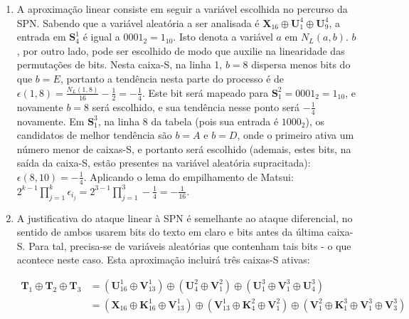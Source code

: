 \documentclass{article}
\begin{document}
\begin{enumerate}
    \item A aproximação linear consiste em seguir a variável escolhida no
        percurso da SPN. Sabendo que a variável aleatória a ser analisada é
        $\textbf{X}_{16} \oplus \textbf{U}^{4}_{1} \oplus \textbf{U}^{4}_{9}$,
        a entrada em $\textbf{S}^{1}_{4}$ é igual a $0001_{2} = 1_{10}$. Isto
        denota a variável $a$ em $N_{L}(a, b)$. $b$, por outro lado, pode ser
        escolhido de modo que auxilie na linearidade das permutações de bits.
        Nesta caixa-S, na linha 1, $b = 8$ dispersa menos bits do que $b = E$,
        portanto a tendência nesta parte do processo é de
        $\epsilon(1, 8) = \frac{N_{L}(1, 8)}{16} - \frac{1}{2} = -\frac{1}{4}$.
        Este bit será mapeado para $\textbf{S}^{2}_{1} = 0001_{2} = 1_{10}$,
        e novamente $b = 8$ será escolhido, e sua tendência nesse ponto será
        $-\frac{1}{4}$ novamente. Em $\textbf{S}^{3}_{1}$, na linha 8 da
        tabela (pois sua entrada é $1000_{2}$), os candidatos de melhor
        tendência são $b = A$ e $b = D$, onde o primeiro ativa um número menor
        de caixas-S, e portanto será escolhido (ademais, estes bits, na saída
        da caixa-S, estão presentes na variável aleatória supracitada):
        $\epsilon(8, 10) = -\frac{1}{4}$. Aplicando o lema do empilhamento de
        Matsui: $2^{k-1} \prod_{j=1}^{k} \epsilon_{i_{j}}
        = 2^{3-1} \prod_{j=1}^{3} -\frac{1}{4} = -\frac{1}{16}$.

    \item A justificativa do ataque linear à SPN é semelhante ao ataque
        diferencial, no sentido de ambos usarem bits do texto em claro e bits
        antes da última caixa-S. Para tal, precisa-se de variáveis aleatórias
        que contenham tais bits - o que acontece neste caso. Esta aproximação
        incluirá três caixas-S ativas: \vspace{-4mm}

    \begin{align*}
        \textbf{T}_{1} \oplus \textbf{T}_{2} \oplus \textbf{T}_{3}
        &=  (\textbf{U}^{1}_{16} \oplus \textbf{V}^{1}_{13}) \oplus
                (\textbf{U}^{2}_{4} \oplus \textbf{V}^{2}_{1}) \oplus
                (\textbf{U}^{3}_{1} \oplus \textbf{V}^{3}_{1} \oplus
                    \textbf{U}^{3}_{4}) \\
        &=  (\textbf{X}_{16} \oplus \textbf{K}^{1}_{16} \oplus
                \textbf{V}^{1}_{13}) \oplus
            (\textbf{V}^{1}_{13} \oplus \textbf{K}^{2}_{4} \oplus
                \textbf{V}^{2}_{1}) \oplus
            (\textbf{V}^{2}_{1} \oplus \textbf{K}^{3}_{1} \oplus
                \textbf{V}^{3}_{1} \oplus \textbf{V}^{3}_{3})
        \end{align*}


\end{enumerate}
\end{document}
